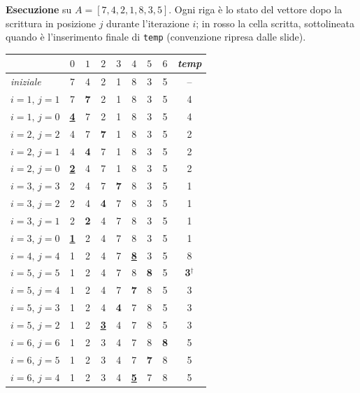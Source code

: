 \documentclass[12pt, a4paper]{article}
\begin{document}
\textbf{Esecuzione} su $A=[7,4,2,1,8,3,5]$. Ogni riga è lo stato del vettore dopo la scrittura in posizione $j$ durante l'iterazione $i$; in rosso la cella scritta, sottolineata quando è l'inserimento finale di \texttt{temp} (convenzione ripresa dalle slide).
\begin{center}
\small
\begin{tabular}{l|ccccccc|c}
\toprule
 & $0$ & $1$ & $2$ & $3$ & $4$ & $5$ & $6$ & \textit{temp} \\
\midrule
\textit{iniziale} & 7 & 4 & 2 & 1 & 8 & 3 & 5 & -- \\
\midrule
$i{=}1,\,j{=}1$ & 7 & {\color{red!70!black}\bfseries 7} & 2 & 1 & 8 & 3 & 5 & 4 \\
$i{=}1,\,j{=}0$ & \underline{\color{red!70!black}\bfseries 4} & 7 & 2 & 1 & 8 & 3 & 5 & 4 \\
$i{=}2,\,j{=}2$ & 4 & 7 & {\color{red!70!black}\bfseries 7} & 1 & 8 & 3 & 5 & 2 \\
$i{=}2,\,j{=}1$ & 4 & {\color{red!70!black}\bfseries 4} & 7 & 1 & 8 & 3 & 5 & 2 \\
$i{=}2,\,j{=}0$ & \underline{\color{red!70!black}\bfseries 2} & 4 & 7 & 1 & 8 & 3 & 5 & 2 \\
$i{=}3,\,j{=}3$ & 2 & 4 & 7 & {\color{red!70!black}\bfseries 7} & 8 & 3 & 5 & 1 \\
$i{=}3,\,j{=}2$ & 2 & 4 & {\color{red!70!black}\bfseries 4} & 7 & 8 & 3 & 5 & 1 \\
$i{=}3,\,j{=}1$ & 2 & {\color{red!70!black}\bfseries 2} & 4 & 7 & 8 & 3 & 5 & 1 \\
$i{=}3,\,j{=}0$ & \underline{\color{red!70!black}\bfseries 1} & 2 & 4 & 7 & 8 & 3 & 5 & 1 \\
$i{=}4,\,j{=}4$ & 1 & 2 & 4 & 7 & \underline{\color{red!70!black}\bfseries 8} & 3 & 5 & 8 \\
$i{=}5,\,j{=}5$ & 1 & 2 & 4 & 7 & 8 & {\color{red!70!black}\bfseries 8} & 5 & {\color{red!70!black}\bfseries 3}$^{\dagger}$ \\
$i{=}5,\,j{=}4$ & 1 & 2 & 4 & 7 & {\color{red!70!black}\bfseries 7} & 8 & 5 & 3 \\
$i{=}5,\,j{=}3$ & 1 & 2 & 4 & {\color{red!70!black}\bfseries 4} & 7 & 8 & 5 & 3 \\
$i{=}5,\,j{=}2$ & 1 & 2 & \underline{\color{red!70!black}\bfseries 3} & 4 & 7 & 8 & 5 & 3 \\
$i{=}6,\,j{=}6$ & 1 & 2 & 3 & 4 & 7 & 8 & {\color{red!70!black}\bfseries 8} & 5 \\
$i{=}6,\,j{=}5$ & 1 & 2 & 3 & 4 & 7 & {\color{red!70!black}\bfseries 7} & 8 & 5 \\
$i{=}6,\,j{=}4$ & 1 & 2 & 3 & 4 & \underline{\color{red!70!black}\bfseries 5} & 7 & 8 & 5 \\
\bottomrule
\end{tabular}
\end{center}
\end{document}
